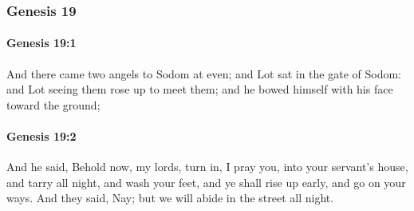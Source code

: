 	\subsubsection{Genesis 19} %
		\label{GENESIS-19}

		\paragraph{Genesis 19:1} %
			\label{GENESIS-19-1}

			And there came two angels to Sodom at even; and Lot sat in the gate of Sodom: and Lot seeing them rose up to meet them; and he bowed himself with his face toward the ground;


		\paragraph{Genesis 19:2} %
			\label{GENESIS-19-2}

			And he said, Behold now, my lords, turn in, I pray you, into your servant's house, and tarry all night, and wash your feet, and ye shall rise up early, and go on your ways. And they said, Nay; but we will abide in the street all night.


